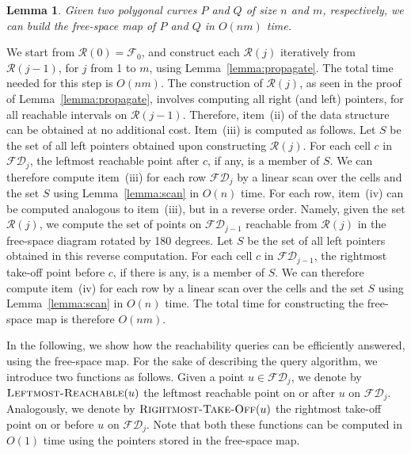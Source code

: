 \documentclass[12pt]{dalthesis}
\def\favoritefont{\bfseries \sffamily}
\def\QED{\ensuremath{{\Box}}}
\def\markatright#1{\leavevmode\unskip\nobreak\quad\hspace*{\fill}{#1}}
\newenvironment{proof}
	{\begin{trivlist}\item[\hskip\labelsep{\favoritefont Proof:}]}
	{\markatright{\QED}\end{trivlist}}
\newtheorem{lemma}[theorem]{Lemma}
\newcommand{\qed}{}
\newcommand{\CF}{{\mathscr F}}
\newcommand{\CR}{{\mathscr R}}
\newcommand{\fs}{free-space }
\newcommand{\FD}{\mathscr {FD}}
\newcommand{\lr}{\mbox{\sc Leftmost-Reachable}}
\newcommand{\rl}{\mbox{\sc Rightmost-Take-Off}}
\newcommand{\F}{\CF}
\newcommand{\R}{\CR}
\begin{document}
\begin{lemma} \label{lemma:map}
	Given two polygonal curves $P$ and $Q$ of size $n$ and $m$, respectively,
	we can build the \fs map of $P$ and $Q$ in $O(nm)$ time.
\end{lemma}

\begin{proof}
	We start from $\R(0) = \F_0$, 
	and construct each $\R(j)$ iteratively from $\R(j-1)$, for $j$ from 1 to $m$,
	using Lemma~\ref{lemma:propagate}.
	The total time needed for this step is $O(nm)$.
	The construction of $\R(j)$,
	as seen in the proof of Lemma~\ref{lemma:propagate}, 
	involves computing all right (and left) pointers,
	for all reachable intervals on $\R(j-1)$. 
	Therefore, item~(ii) of the data structure can be obtained at no additional cost.
	Item~(iii) is computed as follows.
	Let $S$ be the set of all left pointers obtained upon constructing $\R(j)$.
	For each cell $c$ in $\FD_j$, the leftmost reachable point after $c$, if any, 
	is a member of $S$. 
	We can therefore compute item~(iii) for each row $\FD_j$
	by a linear scan over the cells and the set $S$ 
	using Lemma~\ref{lemma:scan} in $O(n)$ time.
	For each row, item~(iv) can be computed analogous to item~(iii), but in a reverse order.
	Namely, given the set $\R(j)$, we compute the set of points on $\FD_{j-1}$
	reachable from $\R(j)$ in the \fs diagram rotated by 180 degrees.
	Let $S$ be the set of all left pointers obtained in this reverse computation.
	For each cell $c$ in $\FD_{j-1}$, the rightmost take-off point before $c$, if there is any, 
	is a member of $S$. 
	We can therefore compute item~(iv) for each row 
	by a linear scan over the cells and the set $S$ 
	using Lemma~\ref{lemma:scan} in $O(n)$ time.
	The total time for constructing the \fs map is therefore $O(nm)$.
	\qed
\end{proof}


In the following, we show how the reachability queries can be 
efficiently answered, using the \fs map.
For the sake of describing the query algorithm, 
we introduce two functions as follows.
Given a point $u \in \FD_j$,
we denote by $\lr(u)$ the leftmost reachable point on or after $u$ on $\FD_j$.
Analogously, we denote by $\rl(u)$ the rightmost take-off point on or before $u$ on $\FD_j$.
Note that both these functions can be computed in $O(1)$
time using the pointers stored in the \fs map.
\end{document}
